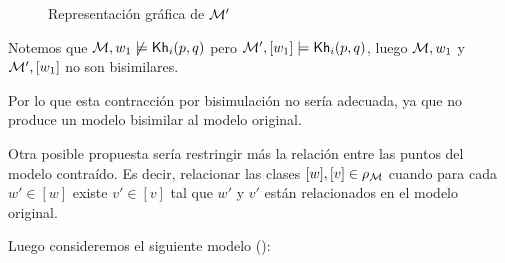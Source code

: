 \begin{figure}[h]
    \hspace{3.2cm}
    \vspace{0.8cm}
    \hspace{1cm}
    \caption{Representación gráfica de $\mathcal{M}'$}
    \label{fig:1stproposalcontraction}
\end{figure}

Notemos que $\mathcal{M}, w_1 \not\models \mathsf{Kh}_i(p,q)$ pero $\mathcal{M}', [w_1] \models \mathsf{Kh}_i(p,q)$, luego $\mathcal{M},w_1$ y 
$\mathcal{M}',[w_1]$ no son bisimilares.

Por lo que esta contracción por bisimulación no sería adecuada, ya que no produce un modelo bisimilar al modelo original.

Otra posible propuesta sería restringir más la relación entre las puntos del modelo contraído. Es decir, relacionar las clases 
$[w], [v] \in \rho_{\mathcal{M}}$ cuando para cada $w' \in [w]$ existe $v' \in [v]$ tal que $w'$ y $v'$ están relacionados en el modelo original.

Luego consideremos el siguiente modelo ():


